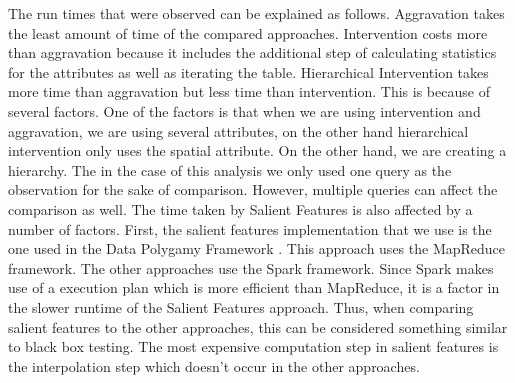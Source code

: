 The run times that were observed can be explained as follows. Aggravation takes the least amount of time of the compared approaches. Intervention costs more than aggravation because it includes the additional step of calculating statistics for the attributes as well as iterating the table. Hierarchical Intervention takes more time than aggravation but less time than intervention. This is because of several factors. One of the factors is that when we are using intervention and aggravation, we are using several attributes, on the other hand hierarchical intervention only uses the spatial attribute. On the other hand, we are creating a hierarchy. The in the case of this analysis we only used one query as the observation for the sake of comparison. However, multiple queries can affect the comparison as well. The time taken by Salient Features is also affected by a number of factors. First, the salient features implementation that we use is the one used in the Data Polygamy Framework \citep{chirigati2016data}. This approach uses the MapReduce framework. The other approaches use the Spark framework. Since Spark makes use of a execution plan which is more efficient than MapReduce, it is a factor in the slower runtime of the Salient Features approach. Thus, when comparing salient features to the other approaches, this can be considered something similar to black box testing. The most expensive computation step in salient features is the interpolation step which doesn't occur in the other approaches.


